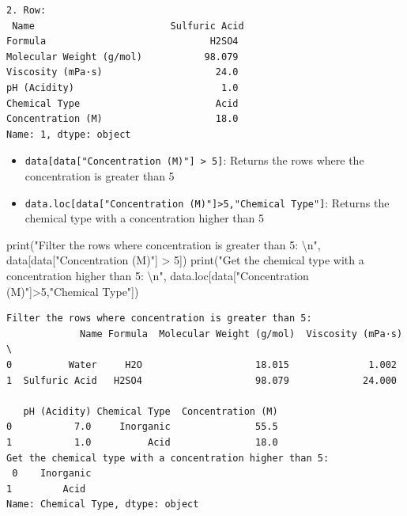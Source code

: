 \documentclass[
  letterpaper,
  DIV=11,
  numbers=noendperiod]{scrreprt}
\newenvironment{Shaded}{\begin{snugshade}}{\end{snugshade}}
\newcommand{\BuiltInTok}[1]{\textcolor[rgb]{0.00,0.23,0.31}{#1}}
\newcommand{\CharTok}[1]{\textcolor[rgb]{0.13,0.47,0.30}{#1}}
\newcommand{\DecValTok}[1]{\textcolor[rgb]{0.68,0.00,0.00}{#1}}
\newcommand{\NormalTok}[1]{\textcolor[rgb]{0.00,0.23,0.31}{#1}}
\newcommand{\OperatorTok}[1]{\textcolor[rgb]{0.37,0.37,0.37}{#1}}
\newcommand{\StringTok}[1]{\textcolor[rgb]{0.13,0.47,0.30}{#1}}
\providecommand{\tightlist}{%
  \setlength{\itemsep}{0pt}\setlength{\parskip}{0pt}}\usepackage{longtable,booktabs,array}
\begin{document}
\begin{verbatim}
2. Row: 
 Name                        Sulfuric Acid
Formula                             H2SO4
Molecular Weight (g/mol)           98.079
Viscosity (mPa·s)                    24.0
pH (Acidity)                          1.0
Chemical Type                        Acid
Concentration (M)                    18.0
Name: 1, dtype: object
\end{verbatim}

\begin{itemize}
\tightlist
\item
  \texttt{data{[}data{[}"Concentration\ (M)"{]}\ \textgreater{}\ 5{]}}:
  Returns the rows where the concentration is greater than 5
\item
  \texttt{data.loc{[}data{[}"Concentration\ (M)"{]}\textgreater{}5,"Chemical\ Type"{]}}:
  Returns the chemical type with a concentration higher than 5
\end{itemize}

\begin{Shaded}
\begin{Highlighting}[]
\BuiltInTok{print}\NormalTok{(}\StringTok{"Filter the rows where concentration is greater than 5: }\CharTok{\textbackslash{}n}\StringTok{"}\NormalTok{, data[data[}\StringTok{"Concentration (M)"}\NormalTok{] }\OperatorTok{\textgreater{}} \DecValTok{5}\NormalTok{])}
\BuiltInTok{print}\NormalTok{(}\StringTok{"Get the chemical type with a concentration higher than 5: }\CharTok{\textbackslash{}n}\StringTok{"}\NormalTok{, }
\NormalTok{      data.loc[data[}\StringTok{"Concentration (M)"}\NormalTok{]}\OperatorTok{\textgreater{}}\DecValTok{5}\NormalTok{,}\StringTok{"Chemical Type"}\NormalTok{])}
\end{Highlighting}
\end{Shaded}

\begin{verbatim}
Filter the rows where concentration is greater than 5: 
             Name Formula  Molecular Weight (g/mol)  Viscosity (mPa·s)  \
0          Water     H2O                    18.015              1.002   
1  Sulfuric Acid   H2SO4                    98.079             24.000   

   pH (Acidity) Chemical Type  Concentration (M)  
0           7.0     Inorganic               55.5  
1           1.0          Acid               18.0  
Get the chemical type with a concentration higher than 5: 
 0    Inorganic
1         Acid
Name: Chemical Type, dtype: object
\end{verbatim}
\end{document}
